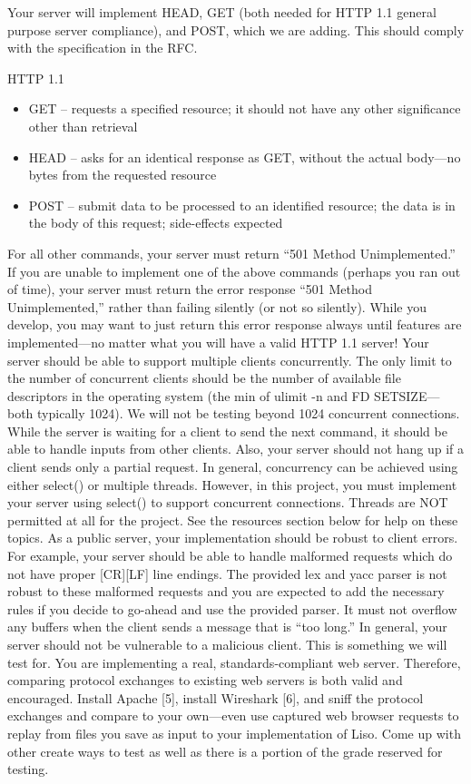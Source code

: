 \documentclass[12pt]{article}
\begin{document}
Your server will implement HEAD, GET (both needed for HTTP 1.1 general purpose server compliance), and POST, which we are adding. This should comply with the specification in the RFC.

HTTP 1.1
\begin{itemize}
\item  GET – requests a specified resource; it should not have any other significance other
than retrieval
\item  HEAD – asks for an identical response as GET, without the actual body—no bytes from the requested resource
\item  POST – submit data to be processed to an identified resource; the data is in the body of this request; side-effects expected
\end{itemize}

For all other commands, your server must return “501 Method Unimplemented.” If you are unable to implement one of the above commands (perhaps you ran out of time), your server must return the error response “501 Method Unimplemented,” rather than failing silently (or not so silently). While you develop, you may want to just return this error response always until features are implemented—no matter what you will have a valid HTTP 1.1 server!
Your server should be able to support multiple clients concurrently. The only limit to the number of concurrent clients should be the number of available file descriptors in the operating system (the min of ulimit -n and FD SETSIZE—both typically 1024). We will not be testing beyond 1024 concurrent connections. While the server is waiting for a client to send the next command, it should be able to handle inputs from other clients. Also, your server should not hang up if a client sends only a partial request. In general, concurrency can be achieved using either select() or multiple threads. However, in this project, you must implement your server using select() to support concurrent connections. Threads are NOT permitted at all for the project. See the resources section below for help on these topics. As a public server, your implementation should be robust to client errors. For example, your server should be able to handle malformed requests which do not have proper [CR][LF] line endings. The provided lex and yacc parser is not robust to these malformed requests and you are expected to add the necessary rules if you decide to go-ahead and use the provided parser. It must not overflow any buffers when the client sends a message that is “too long.” In general, your server should not be vulnerable to a malicious client. This is something we will test for.
You are implementing a real, standards-compliant web server. Therefore, comparing protocol exchanges to existing web servers is both valid and encouraged. Install Apache [5], install Wireshark [6], and sniff the protocol exchanges and compare to your own—even use captured web browser requests to replay from files you save as input to your implementation of Liso. Come up with other create ways to test as well as there is a portion of the grade reserved for testing.
\end{document}
